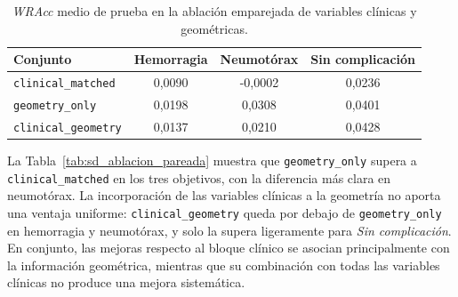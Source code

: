 \begin{table}[!htbp]
    \centering
    \small
    \setlength{\tabcolsep}{4pt}
    \caption{\textit{WRAcc} medio de prueba en la ablación emparejada de variables clínicas y geométricas.}
    \label{tab:sd_ablacion_wracc}
    \begin{tabular}{lccc}
        \hline
        \textbf{Conjunto} &
        \textbf{Hemorragia} &
        \textbf{Neumotórax} &
        \textbf{Sin complicación} \\
        \hline
        \texttt{clinical\_matched}
        & 0,0090 & -0,0002 & 0,0236 \\

        \texttt{geometry\_only}
        & 0,0198 & 0,0308 & 0,0401 \\

        \texttt{clinical\_geometry}
        & 0,0137 & 0,0210 & 0,0428 \\
        \hline
    \end{tabular}
\end{table}




La Tabla~\ref{tab:sd_ablacion_pareada} muestra que \texttt{geometry\_only} supera a \texttt{clinical\_matched} en los tres objetivos, con la diferencia más clara en neumotórax. La incorporación de las variables clínicas a la geometría no aporta una ventaja uniforme: \texttt{clinical\_geometry} queda por debajo de \texttt{geometry\_only} en hemorragia y neumotórax, y solo la supera ligeramente para \textit{Sin complicación}. En conjunto, las mejoras respecto al bloque clínico se asocian principalmente con la información geométrica, mientras que su combinación con todas las variables clínicas no produce una mejora sistemática.


